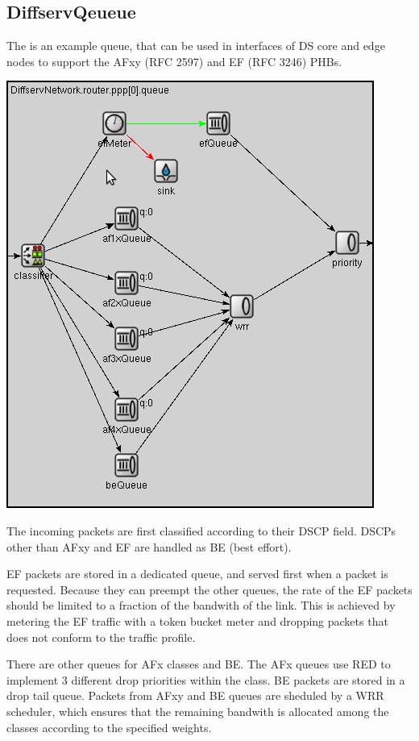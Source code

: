 \subsection{DiffservQeueue}

The  is an example queue, that can be used in
interfaces of DS core and edge nodes to support
the AFxy (RFC 2597) and EF (RFC 3246) PHBs.

\begin{center}
\includegraphics[scale=0.7]{figures/DiffservQueue.png}
\end{center}

The incoming packets are first classified according to
their DSCP field. DSCPs other than AFxy and EF are handled
as BE (best effort).

EF packets are stored in a dedicated queue, and served first
when a packet is requested. Because they can preempt the other
queues, the rate of the EF packets should be limited to a fraction
of the bandwith of the link. This is achieved by metering the EF
traffic with a token bucket meter and dropping packets that
does not conform to the traffic profile.

There are other queues for AFx classes and BE. The AFx queues
use RED to implement 3 different drop priorities within the class.
BE packets are stored in a drop tail queue.
Packets from AFxy and BE queues are sheduled by a WRR scheduler,
which ensures that the remaining bandwith is allocated among the classes
according to the specified weights.

